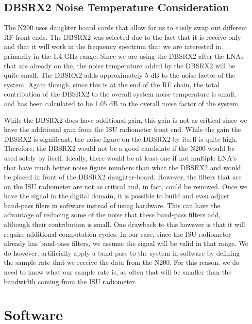 \subsection{DBSRX2 Noise Temperature Consideration}

The N200 uses daughter board cards that allow for us to easily swap out different RF front ends.  The DBSRX2 was selected due to the fact that it is receive only and that it will work in the frequency spectrum that we are interested in, primarily in the 1.4 GHz range.  Since we are using the DBSRX2 after the LNAs that are already on the, the noise temperature added by the DBSRX2 will be quite small.  The DBSRX2 adds approximately 5 dB to the noise factor of the system.  Again though, since this is at the end of the RF chain, the total contribution of the DBSRX2 to the overall system noise temperature is small, and has been calculated to be 1.05 dB to the overall noise factor of the system.

While the DBSRX2 does have additional gain, this gain is not as critical since we have the additional gain from the ISU radiometer front end.  While the gain the DBSRX2 is significant, the noise figure on the DBSRX2 by itself is quite high.  Therefore, the DBSRX2 would not be a good candidate if the N200 would be used solely by itself.  Ideally, there would be at least one if not multiple LNA's that have much better noise figure numbers than what the DBSRX2 and would be placed in front of the DBSRX2 daughter-board.  However, the filters that are on the ISU radiometer are not as critical and, in fact, could be removed.  Once we have the signal in the digital domain, it is possible to build and even adjust band-pass filers in software instead of using hardware. This can have the advantage of reducing some of the noise that these band-pass filters add, although their contribution is small.  One drawback to this however is that it will require additional computation cycles.  In our case, since the ISU radiometer already has band-pass filters, we assume the signal will be valid in that range.  We do however, artificially apply a band-pass to the system in software by defining the sample rate that we receive the data from the N200.  For this reason, we do need to know what our sample rate is, as often that will be smaller than the bandwidth coming from the ISU radiometer. 

\section{Software}


